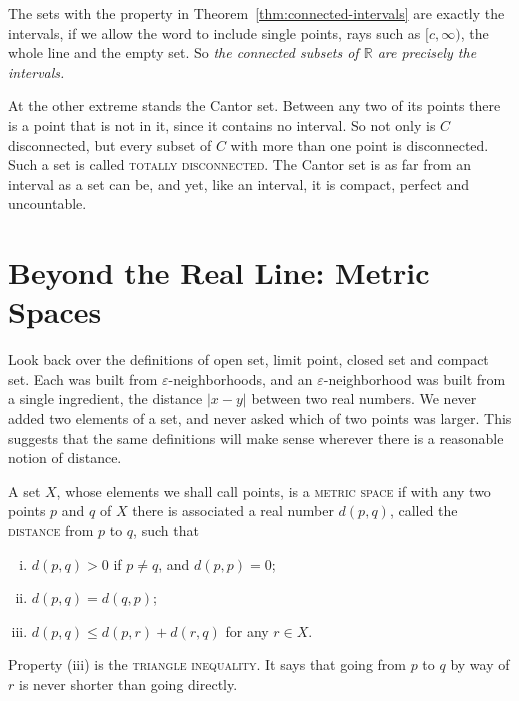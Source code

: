 The sets with the property in Theorem~\ref{thm:connected-intervals} are exactly the intervals, if we allow the word to include single points, rays such as $[c, \infty)$, the whole line and the empty set.  So \emph{the connected subsets of $\mathbb{R}$ are precisely the intervals.}

At the other extreme stands the Cantor set.  Between any two of its points there is a point that is not in it, since it contains no interval.  So not only is $C$ disconnected, but every subset of $C$ with more than one point is disconnected.  Such a set is called \textsc{totally disconnected}.  The Cantor set is as far from an interval as a set can be, and yet, like an interval, it is compact, perfect and uncountable.

\section{Beyond the Real Line: Metric Spaces}\label{sec:metric-spaces}

Look back over the definitions of open set, limit point, closed set and compact set.  Each was built from $\varepsilon$-neighborhoods, and an $\varepsilon$-neighborhood was built from a single ingredient, the distance $|x - y|$ between two real numbers.  We never added two elements of a set, and never asked which of two points was larger.  This suggests that the same definitions will make sense wherever there is a reasonable notion of distance.

\begin{definition}
A set $X$, whose elements we shall call points, is a \textsc{metric space} if with any two points $p$ and $q$ of $X$ there is associated a real number $d(p,q)$, called the \textsc{distance} from $p$ to $q$, such that
\begin{enumerate}[(i)]
	\item $d(p,q) > 0$ if $p \neq q$, and $d(p,p) = 0$;
	\item $d(p,q) = d(q,p)$;
	\item $d(p,q) \leq d(p,r) + d(r,q)$ for any $r \in X$.
\end{enumerate}
\end{definition}

Property (iii) is the \textsc{triangle inequality}.  It says that going from $p$ to $q$ by way of $r$ is never shorter than going directly.

